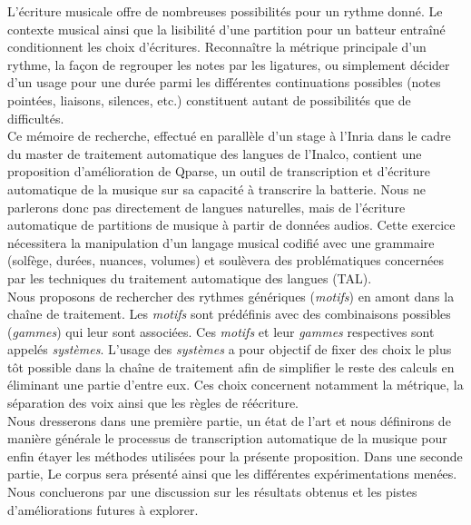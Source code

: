 L’écriture musicale offre de nombreuses possibilités pour un rythme donné. Le contexte musical ainsi que la lisibilité d’une partition pour un batteur entraîné conditionnent les choix d’écritures. Reconnaître la métrique principale d’un rythme, la façon de regrouper les notes par les ligatures, ou simplement décider d’un usage pour une durée parmi les différentes continuations possibles (notes pointées, liaisons, silences, etc.) constituent autant de possibilités que de difficultés.\\Ce mémoire de recherche, effectué en parallèle d’un stage à l’Inria dans le cadre du master de traitement automatique des langues de l’Inalco, contient une proposition d’amélioration de Qparse, un outil de transcription et d’écriture automatique de la musique sur sa capacité à transcrire la batterie. Nous ne parlerons donc pas directement de langues naturelles, mais de l’écriture automatique de partitions de musique à partir de données audios. Cette exercice nécessitera la manipulation d’un langage musical codifié avec une grammaire (solfège, durées, nuances, volumes) et soulèvera des problématiques concernées par les techniques du traitement automatique des langues (TAL).\\
Nous proposons de rechercher des rythmes génériques (\textit{motifs}) en amont dans la chaîne de traitement. Les \textit{motifs} sont prédéfinis avec des combinaisons possibles (\textit{gammes}) qui leur sont associées. Ces \textit{motifs} et leur \textit{gammes} respectives sont appelés \textit{systèmes}. L’usage des \textit{systèmes} a pour objectif de fixer des choix le plus tôt possible dans la chaîne de traitement afin de simplifier le reste des calculs en éliminant une partie d’entre eux. Ces choix concernent notamment la métrique, la séparation des voix ainsi que les règles de réécriture.\\
Nous dresserons dans une première partie, un état de l’art et nous définirons de manière générale le processus de transcription automatique de la musique pour enfin étayer les méthodes utilisées pour la présente proposition. Dans une seconde partie, Le corpus sera présenté ainsi que les différentes expérimentations menées. Nous concluerons par une discussion sur les résultats obtenus et les pistes d’améliorations futures à explorer.
